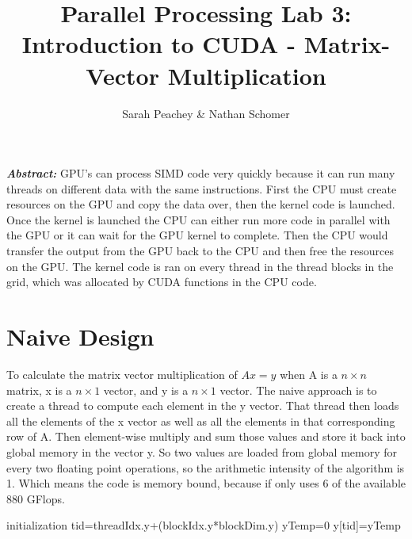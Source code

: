 \documentclass[12pt]{article}
\begin{document}
\title{Parallel Processing Lab 3: \\ Introduction to CUDA - Matrix-Vector
Multiplication}
\author{Sarah Peachey \& Nathan Schomer}
\maketitle

\textbf{\textit{Abstract:}} GPU's can process SIMD code very quickly because
it can run many threads on different data with the same instructions. First
the CPU must create resources on the GPU and copy the data over, then the
kernel code is launched. Once the kernel is launched the CPU can either run
more code in parallel with the GPU or it can wait for the GPU kernel to
complete. Then the CPU would transfer the output from the GPU back to the CPU 
and then free the resources on the GPU. The kernel code is ran on every
thread in the thread blocks in the grid, which was allocated by CUDA
functions in the CPU code.   
\newpage

\vspace{-1.5cm}
\section{Naive Design}
\vspace{-0.25cm}

\qquad To calculate the matrix vector multiplication of $Ax=y$ when A is a
$n \times n$ matrix, x is a $n \times 1$ vector, and y is a $n \times 1$
vector. The naive approach is to create a thread to compute each element in
the y vector. That thread then loads all the elements of the x vector as
well as all the elements in that corresponding row of A. Then element-wise
multiply and sum those values and store it back into global memory in the
vector y. So two values are loaded from global memory for every two floating
point operations, so the arithmetic intensity of the algorithm is 1. Which
means the code is memory bound, because if only uses 6 of the available 880
GFlops. 

\vspace{1cm}
\begin{algorithm}[H]
 	initialization\;
	tid=threadIdx.y+(blockIdx.y*blockDim.y)\;
	yTemp=0\;
	y[tid]=yTemp\; 
   	
\end{algorithm}
\end{document}
